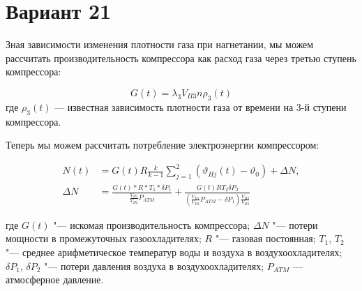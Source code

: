 \documentclass{article}
\begin{document}
\section*{Вариант 21}

Зная зависимости изменения плотности газа при нагнетании, мы можем рассчитать производительность компрессора как расход газа через третью ступень компрессора:

\begin{equation}
  G(t) = \lambda_3 V_{\Pi3} n \rho_3 (t)
\end{equation}
\noindent где $\rho_3 (t)$ — известная зависимость плотности газа от времени на 3-й ступени компрессора.

Теперь мы можем рассчитать потребление электроэнергии компрессором:

\begin{align}
  N(t) &= G(t) R \frac{k}{k - 1} \sum^{2}_{j = 1} (\vartheta_{Hj}(t) - \vartheta_0) + \Delta N, \\
  \Delta N &=
  \frac{G(t) * R * T_1 * \delta P_1}
       {\frac{V_{\Pi1}}{V_{\Pi2}} P_{ATM}} +
  \frac{G(t) R T_2 \delta P_2}
       {(\frac{V_{\Pi1}}{V_{\Pi2}} P_{ATM} - \delta P_1) \frac{V_{\Pi2}}{V_{\Pi3}}}
\end{align}

\noindent где $G(t)$ "--- искомая производительность компрессора; $\Delta N$ "--- потери мощности в промежуточных газоохладителях; $R$ "--- газовая постоянная; $T_1$, $T_2$ "--- среднее арифметическое температур воды и воздуха в воздухоохладителях; $\delta P_1$, $\delta P_2$ "--- потери давления воздуха в воздухоохладителях; $P_{ATM}$ — атмосферное давление.
\end{document}
